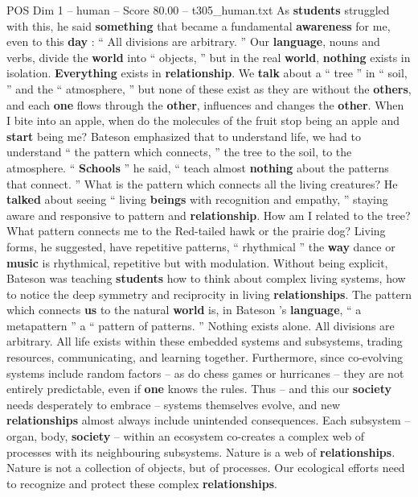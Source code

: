 \begin{textsample}{POS Dim 1 – human – Score 80.00 – t305\_human.txt}
As \textbf{students} struggled with this, he said \textbf{something} that became a fundamental \textbf{awareness} for me, even to this \textbf{day} : “ All divisions are arbitrary. ” Our \textbf{language}, nouns and verbs, divide the \textbf{world} into “ objects, ” but in the real \textbf{world}, \textbf{nothing} exists in isolation. \textbf{Everything} exists in \textbf{relationship}.
We \textbf{talk} about a “ tree ” in “ soil, ” and the “ atmosphere, ” but none of these exist as they are without the \textbf{others}, and each \textbf{one} flows through the \textbf{other}, influences and changes the \textbf{other}.
When I bite into an apple, when do the molecules of the fruit stop being an apple and \textbf{start} being me?
Bateson emphasized that to understand life, we had to understand “ the pattern which connects, ” the tree to the soil, to the atmosphere. “ \textbf{Schools} ” he said, “ teach almost \textbf{nothing} about the patterns that connect. ” What is the pattern which connects all the living creatures?
He \textbf{talked} about seeing “ living \textbf{beings} with recognition and empathy, ” staying aware and responsive to pattern and \textbf{relationship}.
How am I related to the tree?
What pattern connects me to the Red-tailed hawk or the prairie dog?
Living forms, he suggested, have repetitive patterns, “ rhythmical ” the \textbf{way} dance or \textbf{music} is rhythmical, repetitive but with modulation.
Without being explicit, Bateson was teaching \textbf{students} how to think about complex living systems, how to notice the deep symmetry and reciprocity in living \textbf{relationships}.
The pattern which connects \textbf{us} to the natural \textbf{world} is, in Bateson ’s \textbf{language}, “ a metapattern ” a “ pattern of patterns. ” Nothing exists alone.
All divisions are arbitrary.
All life exists within these embedded systems and subsystems, trading resources, communicating, and learning together.
Furthermore, since co-evolving systems include random factors – as do chess games or hurricanes – they are not entirely predictable, even if \textbf{one} knows the rules.
Thus – and this our \textbf{society} needs desperately to embrace – systems themselves evolve, and new \textbf{relationships} almost always include unintended consequences.
Each subsystem – organ, body, \textbf{society} – within an ecosystem co-creates a complex web of processes with its neighbouring subsystems.
Nature is a web of \textbf{relationships}.
Nature is not a collection of objects, but of processes.
Our ecological efforts need to recognize and protect these complex \textbf{relationships}.

\end{textsample}
